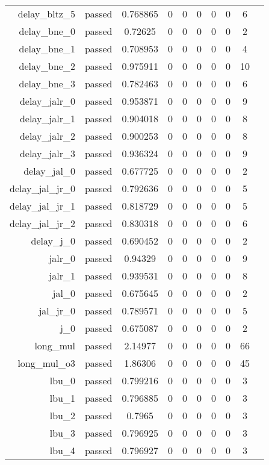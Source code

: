 \begin{longtable}{r|ccccccccc}
    delay\_bltz\_5 & passed & 0.768865 & 0 & 0 & 0 & 0 & 0 & 6 \\
    delay\_bne\_0 & passed & 0.72625 & 0 & 0 & 0 & 0 & 0 & 2 \\
    delay\_bne\_1 & passed & 0.708953 & 0 & 0 & 0 & 0 & 0 & 4 \\
    delay\_bne\_2 & passed & 0.975911 & 0 & 0 & 0 & 0 & 0 & 10 \\
    delay\_bne\_3 & passed & 0.782463 & 0 & 0 & 0 & 0 & 0 & 6 \\
    delay\_jalr\_0 & passed & 0.953871 & 0 & 0 & 0 & 0 & 0 & 9 \\
    delay\_jalr\_1 & passed & 0.904018 & 0 & 0 & 0 & 0 & 0 & 8 \\
    delay\_jalr\_2 & passed & 0.900253 & 0 & 0 & 0 & 0 & 0 & 8 \\
    delay\_jalr\_3 & passed & 0.936324 & 0 & 0 & 0 & 0 & 0 & 9 \\
    delay\_jal\_0 & passed & 0.677725 & 0 & 0 & 0 & 0 & 0 & 2 \\
    delay\_jal\_jr\_0 & passed & 0.792636 & 0 & 0 & 0 & 0 & 0 & 5 \\
    delay\_jal\_jr\_1 & passed & 0.818729 & 0 & 0 & 0 & 0 & 0 & 5 \\
    delay\_jal\_jr\_2 & passed & 0.830318 & 0 & 0 & 0 & 0 & 0 & 6 \\
    delay\_j\_0 & passed & 0.690452 & 0 & 0 & 0 & 0 & 0 & 2 \\
    jalr\_0 & passed & 0.94329 & 0 & 0 & 0 & 0 & 0 & 9 \\
    jalr\_1 & passed & 0.939531 & 0 & 0 & 0 & 0 & 0 & 8 \\
    jal\_0 & passed & 0.675645 & 0 & 0 & 0 & 0 & 0 & 2 \\
    jal\_jr\_0 & passed & 0.789571 & 0 & 0 & 0 & 0 & 0 & 5 \\
    j\_0 & passed & 0.675087 & 0 & 0 & 0 & 0 & 0 & 2 \\
    long\_mul & passed & 2.14977 & 0 & 0 & 0 & 0 & 0 & 66 \\
    long\_mul\_o3 & passed & 1.86306 & 0 & 0 & 0 & 0 & 0 & 45 \\
    lbu\_0 & passed & 0.799216 & 0 & 0 & 0 & 0 & 0 & 3 \\
    lbu\_1 & passed & 0.796885 & 0 & 0 & 0 & 0 & 0 & 3 \\
    lbu\_2 & passed & 0.7965 & 0 & 0 & 0 & 0 & 0 & 3 \\
    lbu\_3 & passed & 0.796925 & 0 & 0 & 0 & 0 & 0 & 3 \\
    lbu\_4 & passed & 0.796927 & 0 & 0 & 0 & 0 & 0 & 3 \\

\end{longtable}
